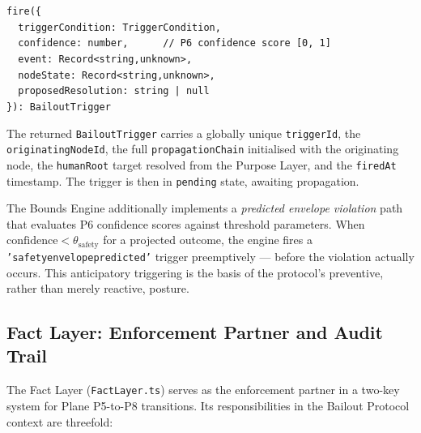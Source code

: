 \medskip
\noindent
\texttt{fire(\{}\\
\texttt{\ \ triggerCondition:\ TriggerCondition,}\\
\texttt{\ \ confidence:\ number,\ \ \ \ \ \ //\ P6\ confidence\ score\ [0,\ 1]}\\
\texttt{\ \ event:\ Record<string,unknown>,}\\
\texttt{\ \ nodeState:\ Record<string,unknown>,}\\
\texttt{\ \ proposedResolution:\ string\ |\ null}\\
\texttt{\}):\ BailoutTrigger}

\medskip
\noindent
The returned \texttt{BailoutTrigger} carries a globally unique \texttt{triggerId}, the \texttt{originatingNodeId}, the full \texttt{propagationChain} initialised with the originating node, the \texttt{humanRoot} target resolved from the Purpose Layer, and the \texttt{firedAt} timestamp. The trigger is then in \texttt{pending} state, awaiting propagation.

The Bounds Engine additionally implements a \emph{predicted envelope violation} path that evaluates P6 confidence scores against threshold parameters. When $\text{confidence} < \theta_{\text{safety}}$ for a projected outcome, the engine fires a \texttt{'safety\textunderscore envelope\textunderscore predicted'} trigger preemptively --- before the violation actually occurs. This anticipatory triggering is the basis of the protocol's preventive, rather than merely reactive, posture.

\subsection{Fact Layer: Enforcement Partner and Audit Trail}
\label{sec:fact-layer-enforcement}

The Fact Layer (\texttt{FactLayer.ts}) serves as the enforcement partner in a two-key system for Plane P5-to-P8 transitions. Its responsibilities in the Bailout Protocol context are threefold:

